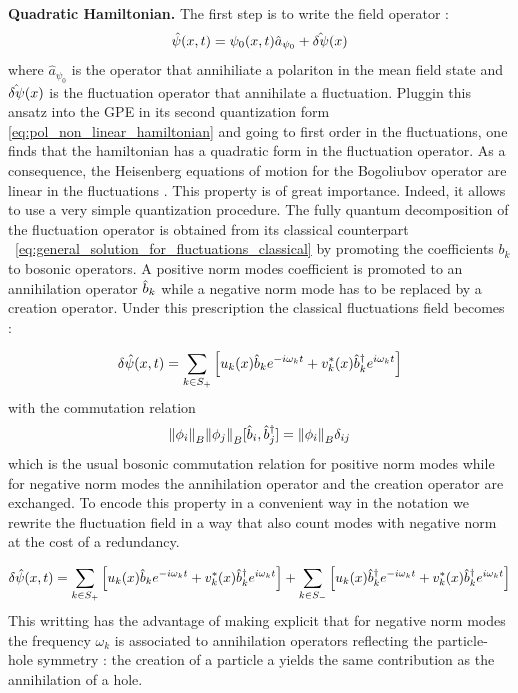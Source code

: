 \textbf{Quadratic Hamiltonian.} The first step is to write the field operator : 
\begin{equation}
    \hat{\psi}(x,t)= \psi_0(x,t)\hat{a}_{\psi_0}+\hat{\delta\psi}(x)
\end{equation}
where $\hat{a}_{\psi_0}$ is the operator that annihiliate a polariton in the mean field state and $\hat{\delta\psi}(x)$ is the fluctuation operator that 
annihilate a fluctuation. Pluggin this ansatz into the GPE in its second quantization form \ref{eq:pol_non_linear_hamiltonian} and going to first order in the fluctuations, one
finds that the hamiltonian has a quadratic form in the fluctuation operator. As a consequence, the Heisenberg
equations of motion for the Bogoliubov operator are linear in the fluctuations \cite{castin_bose-einstein_2001}. This property is of great importance.
Indeed, it allows to use a very simple quantization procedure. The fully quantum decomposition of the 
fluctuation operator is obtained from its classical counterpart ~\ref{eq:general_solution_for_fluctuations_classical} by promoting the coefficients $b_k$ to bosonic operators. A positive norm modes coefficient
is promoted to an annihilation operator $\hat{b}_k$ while a negative norm mode has to be replaced by a creation operator. Under this prescription
the classical fluctuations field becomes :

\begin{equation}
    \delta\hat{\psi}(x,t) =\sum_{k\in S_+}\left[u_k(x)\hat{b}_k e^{-i\omega_k t}+ v^*_k(x)\hat{b}_k^\dagger e^{i\omega_k t}\right]
\end{equation}
with the commutation relation 
\begin{equation}
    \norm{\phi_i}_B\norm{\phi_j}_B[\hat{b}_i, \hat{b}_j^\dagger]  = \norm{\phi_i}_B\delta_{ij}
\end{equation}
which is the usual bosonic commutation relation for positive norm modes while for negative norm modes the annihilation operator and the creation operator are exchanged. To encode this property in a convenient way in the notation we rewrite the fluctuation field in a way that also count modes with negative 
norm at the cost of a redundancy.

\begin{equation}
    \delta\hat{\psi}(x,t) =\sum_{k\in S_+}\left[u_k(x)\hat{b}_k e^{-i\omega_k t}+ v^*_k(x)\hat{b}_k^\dagger e^{i\omega_k t}\right] + \sum_{k\in S_-}\left[u_k(x)\hat{b}_k^\dagger e^{-i\omega_k t}+ v^*_k(x)\hat{b}_k^\dagger e^{i\omega_k t}\right]
\end{equation}
This writting has the advantage of making explicit that for negative norm modes the frequency $\omega_k$ is associated to annihilation operators reflecting the particle-hole symmetry :
the creation of a particle a yields the same contribution as the annihilation of a hole.



